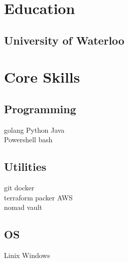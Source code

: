 \documentclass[letterpaper]{deedy-resume} %
\begin{document}
\begin{minipage}[t]{0.33\textwidth} %


\section{Education} 

\subsection{University of Waterloo}



\section{Core Skills}

\subsection{Programming}

golang \textbullet{} Python \textbullet{} Java \\
Powershell \textbullet{} bash \\ 

\sectionspace %

\subsection{Utilities}
git \textbullet{} docker \\
terraform \textbullet{} packer \textbullet{} AWS \\
nomad \textbullet{} vault \\

\sectionspace %

\subsection{OS}
Linix \textbullet{} Windows \\


\end{minipage}
\end{document}
